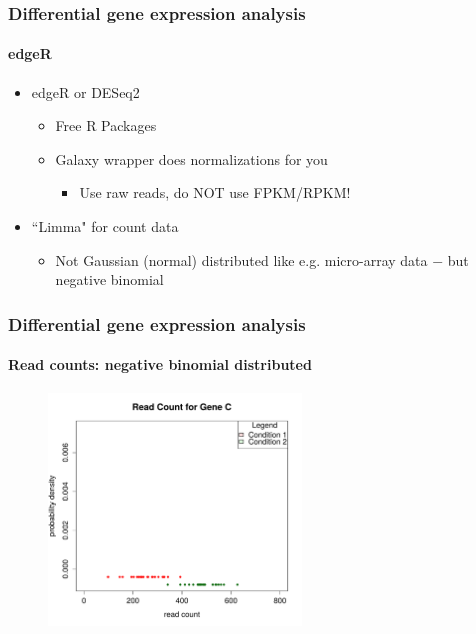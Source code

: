 \documentclass{beamer}			  %
\begin{document}
\begin{frame}
	\frametitle{Differential gene expression analysis}
	\framesubtitle{edgeR}
	\begin{itemize}
			\item edgeR or DESeq2\cite{edger,deseq2}
		\begin{itemize}
			\item Free R Packages
		\item Galaxy wrapper does normalizations for you
		\begin{itemize}
			\item Use raw reads, do NOT use FPKM/RPKM!
		\end{itemize}
	\end{itemize}
		\item ``Limma" for count data
		\begin{itemize}
			\item Not Gaussian (normal) distributed like e.g. micro-array data $-$ but negative binomial 
		\end{itemize}
	\end{itemize}
\end{frame}

\begin{frame}
\frametitle{Differential gene expression analysis}
\framesubtitle{Read counts: negative binomial distributed}
	\begin{figure}
	\includegraphics[width=0.60\textwidth]{figures/dge_10ap.pdf}
	\end{figure}
\end{frame}
\end{document}
